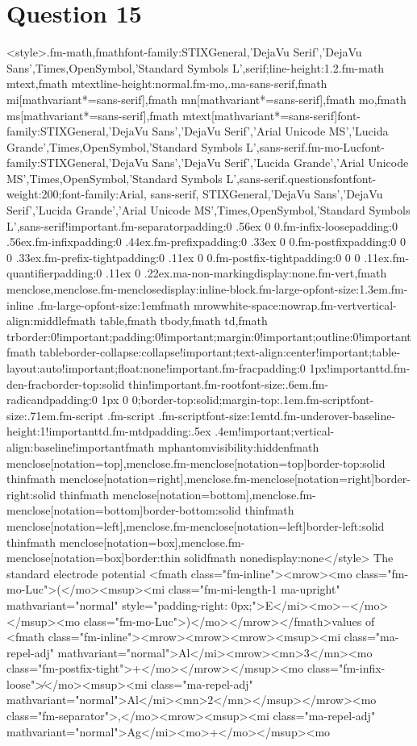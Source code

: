\documentclass{article}
\begin{document}
\section*{Question 15}
<style>.fm-math,fmath{font-family:STIXGeneral,'DejaVu Serif','DejaVu Sans',Times,OpenSymbol,'Standard Symbols L',serif;line-height:1.2}.fm-math mtext,fmath mtext{line-height:normal}.fm-mo,.ma-sans-serif,fmath mi[mathvariant*=sans-serif],fmath mn[mathvariant*=sans-serif],fmath mo,fmath ms[mathvariant*=sans-serif],fmath mtext[mathvariant*=sans-serif]{font-family:STIXGeneral,'DejaVu Sans','DejaVu Serif','Arial Unicode MS','Lucida Grande',Times,OpenSymbol,'Standard Symbols L',sans-serif}.fm-mo-Luc{font-family:STIXGeneral,'DejaVu Sans','DejaVu Serif','Lucida Grande','Arial Unicode MS',Times,OpenSymbol,'Standard Symbols L',sans-serif}.questionsfont{font-weight:200;font-family:Arial, sans-serif, STIXGeneral,'DejaVu Sans','DejaVu Serif','Lucida Grande','Arial Unicode MS',Times,OpenSymbol,'Standard Symbols L',sans-serif!important}.fm-separator{padding:0 .56ex 0 0}.fm-infix-loose{padding:0 .56ex}.fm-infix{padding:0 .44ex}.fm-prefix{padding:0 .33ex 0 0}.fm-postfix{padding:0 0 0 .33ex}.fm-prefix-tight{padding:0 .11ex 0 0}.fm-postfix-tight{padding:0 0 0 .11ex}.fm-quantifier{padding:0 .11ex 0 .22ex}.ma-non-marking{display:none}.fm-vert,fmath menclose,menclose.fm-menclose{display:inline-block}.fm-large-op{font-size:1.3em}.fm-inline .fm-large-op{font-size:1em}fmath mrow{white-space:nowrap}.fm-vert{vertical-align:middle}fmath table,fmath tbody,fmath td,fmath tr{border:0!important;padding:0!important;margin:0!important;outline:0!important}fmath table{border-collapse:collapse!important;text-align:center!important;table-layout:auto!important;float:none!important}.fm-frac{padding:0 1px!important}td.fm-den-frac{border-top:solid thin!important}.fm-root{font-size:.6em}.fm-radicand{padding:0 1px 0 0;border-top:solid;margin-top:.1em}.fm-script{font-size:.71em}.fm-script .fm-script .fm-script{font-size:1em}td.fm-underover-base{line-height:1!important}td.fm-mtd{padding:.5ex .4em!important;vertical-align:baseline!important}fmath mphantom{visibility:hidden}fmath menclose[notation=top],menclose.fm-menclose[notation=top]{border-top:solid thin}fmath menclose[notation=right],menclose.fm-menclose[notation=right]{border-right:solid thin}fmath menclose[notation=bottom],menclose.fm-menclose[notation=bottom]{border-bottom:solid thin}fmath menclose[notation=left],menclose.fm-menclose[notation=left]{border-left:solid thin}fmath menclose[notation=box],menclose.fm-menclose[notation=box]{border:thin solid}fmath none{display:none}</style> The standard electrode potential <fmath class="fm-inline"><mrow><mo class="fm-mo-Luc">(</mo><msup><mi class="fm-mi-length-1 ma-upright" mathvariant="normal" style="padding-right: 0px;">E</mi><mo>−</mo></msup><mo class="fm-mo-Luc">)</mo></mrow></fmath>values of <fmath class="fm-inline"><mrow><mrow><mrow><msup><mi class="ma-repel-adj" mathvariant="normal">Al</mi><mrow><mn>3</mn><mo class="fm-postfix-tight">+</mo></mrow></msup><mo class="fm-infix-loose">∕</mo><msup><mi class="ma-repel-adj" mathvariant="normal">Al</mi><mn>2</mn></msup></mrow><mo class="fm-separator">,</mo><mrow><msup><mi class="ma-repel-adj" mathvariant="normal">Ag</mi><mo>+</mo></msup><mo 
\end{document}
